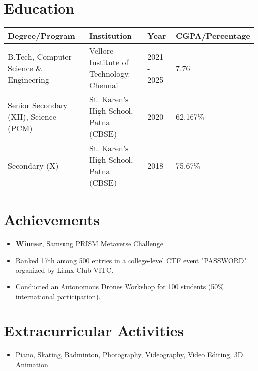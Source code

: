\documentclass[a4paper,10pt]{article}
\newcommand{\sectionbreak}{\vspace{0.2em}} %
\begin{document}
\sectionbreak

\section{Education}
\begin{tabular}{|l|l|l|l|}
\hline
\textbf{Degree/Program} & \textbf{Institution} & \textbf{Year} & \textbf{CGPA/Percentage} \\ \hline
B.Tech, Computer Science \& Engineering & Vellore Institute of Technology, Chennai & 2021 - 2025 & 7.76 \\ \hline
Senior Secondary (XII), Science (PCM) & St. Karen's High School, Patna (CBSE) & 2020 & 62.167\% \\ \hline
Secondary (X) & St. Karen's High School, Patna (CBSE) & 2018 & 75.67\% \\ \hline
\end{tabular}

\sectionbreak

\section{Achievements}
\begin{itemize}[noitemsep, topsep=0pt]
    \item \href{https://drive.google.com/file/d/19xeCrN3ycqXisyDDgIYeygRRVawMKOxu/view?usp=sharing}{\textcolor{accentcolor}{\textbf{Winner}, Samsung PRISM Metaverse Challenge}}
    \item Ranked 17th among 500 entries in a college-level CTF event "PASSWORD" organized by Linux Club VITC.
    \item Conducted an Autonomous Drones Workshop for 100 students (50\% international participation).
\end{itemize}

\sectionbreak

\section{Extracurricular Activities}
\begin{itemize}[noitemsep, topsep=0pt]
    \item Piano, Skating, Badminton, Photography, Videography, Video Editing, 3D Animation
\end{itemize}
\end{document}
